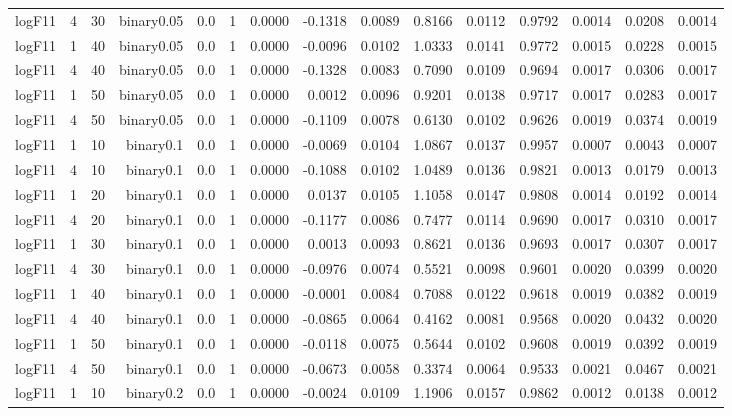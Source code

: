 \begin{longtable}{rrrrrrrrrrrrrrr}
  logF11 & 4 & 30 & binary0.05 & 0.0 & 1 & 0.0000 & -0.1318 & 0.0089 & 0.8166 & 0.0112 & 0.9792 & 0.0014 & 0.0208 & 0.0014 \\ 
  logF11 & 1 & 40 & binary0.05 & 0.0 & 1 & 0.0000 & -0.0096 & 0.0102 & 1.0333 & 0.0141 & 0.9772 & 0.0015 & 0.0228 & 0.0015 \\ 
  logF11 & 4 & 40 & binary0.05 & 0.0 & 1 & 0.0000 & -0.1328 & 0.0083 & 0.7090 & 0.0109 & 0.9694 & 0.0017 & 0.0306 & 0.0017 \\ 
  logF11 & 1 & 50 & binary0.05 & 0.0 & 1 & 0.0000 & 0.0012 & 0.0096 & 0.9201 & 0.0138 & 0.9717 & 0.0017 & 0.0283 & 0.0017 \\ 
  logF11 & 4 & 50 & binary0.05 & 0.0 & 1 & 0.0000 & -0.1109 & 0.0078 & 0.6130 & 0.0102 & 0.9626 & 0.0019 & 0.0374 & 0.0019 \\ 
  logF11 & 1 & 10 & binary0.1 & 0.0 & 1 & 0.0000 & -0.0069 & 0.0104 & 1.0867 & 0.0137 & 0.9957 & 0.0007 & 0.0043 & 0.0007 \\ 
  logF11 & 4 & 10 & binary0.1 & 0.0 & 1 & 0.0000 & -0.1088 & 0.0102 & 1.0489 & 0.0136 & 0.9821 & 0.0013 & 0.0179 & 0.0013 \\ 
  logF11 & 1 & 20 & binary0.1 & 0.0 & 1 & 0.0000 & 0.0137 & 0.0105 & 1.1058 & 0.0147 & 0.9808 & 0.0014 & 0.0192 & 0.0014 \\ 
  logF11 & 4 & 20 & binary0.1 & 0.0 & 1 & 0.0000 & -0.1177 & 0.0086 & 0.7477 & 0.0114 & 0.9690 & 0.0017 & 0.0310 & 0.0017 \\ 
  logF11 & 1 & 30 & binary0.1 & 0.0 & 1 & 0.0000 & 0.0013 & 0.0093 & 0.8621 & 0.0136 & 0.9693 & 0.0017 & 0.0307 & 0.0017 \\ 
  logF11 & 4 & 30 & binary0.1 & 0.0 & 1 & 0.0000 & -0.0976 & 0.0074 & 0.5521 & 0.0098 & 0.9601 & 0.0020 & 0.0399 & 0.0020 \\ 
  logF11 & 1 & 40 & binary0.1 & 0.0 & 1 & 0.0000 & -0.0001 & 0.0084 & 0.7088 & 0.0122 & 0.9618 & 0.0019 & 0.0382 & 0.0019 \\ 
  logF11 & 4 & 40 & binary0.1 & 0.0 & 1 & 0.0000 & -0.0865 & 0.0064 & 0.4162 & 0.0081 & 0.9568 & 0.0020 & 0.0432 & 0.0020 \\ 
  logF11 & 1 & 50 & binary0.1 & 0.0 & 1 & 0.0000 & -0.0118 & 0.0075 & 0.5644 & 0.0102 & 0.9608 & 0.0019 & 0.0392 & 0.0019 \\ 
  logF11 & 4 & 50 & binary0.1 & 0.0 & 1 & 0.0000 & -0.0673 & 0.0058 & 0.3374 & 0.0064 & 0.9533 & 0.0021 & 0.0467 & 0.0021 \\ 
  logF11 & 1 & 10 & binary0.2 & 0.0 & 1 & 0.0000 & -0.0024 & 0.0109 & 1.1906 & 0.0157 & 0.9862 & 0.0012 & 0.0138 & 0.0012 \\ 

\end{longtable}
